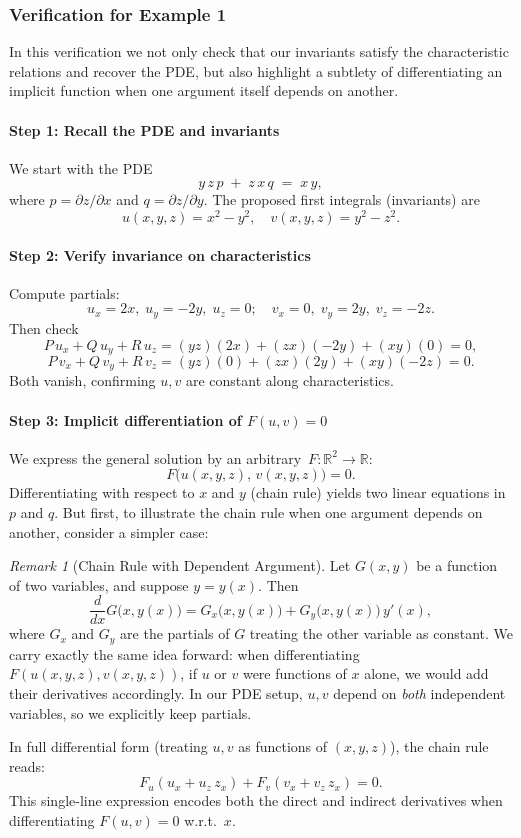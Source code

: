 \documentclass{article}
\theoremstyle{remark}
\newtheorem{remark}{Remark}[section]
\begin{document}
	\subsubsection{Verification for Example 1}
	In this verification we not only check that our invariants satisfy the characteristic relations and recover the PDE, but also highlight a subtlety of differentiating an implicit function when one argument itself depends on another.
	
	\paragraph{Step 1: Recall the PDE and invariants}
	We start with the PDE
	\[
	y\,z\,p \;+\; z\,x\,q \;=\; x\,y,
	\]
	where $p=\partial z/\partial x$ and $q=\partial z/\partial y$.  The proposed first integrals (invariants) are
	\[
	u(x,y,z)=x^2 - y^2,
	\quad
	v(x,y,z)=y^2 - z^2.
	\]
	
	\paragraph{Step 2: Verify invariance on characteristics}
	Compute partials:
	\[
	u_x=2x,\;u_y=-2y,\;u_z=0;
	\quad
	v_x=0,\;v_y=2y,\;v_z=-2z.
	\]
	Then check
	\[
	P\,u_x+Q\,u_y+R\,u_z=(yz)(2x)+(zx)(-2y)+(xy)(0)=0,
	\]
	\[
	P\,v_x+Q\,v_y+R\,v_z=(yz)(0)+(zx)(2y)+(xy)(-2z)=0.
	\]
	Both vanish, confirming $u,v$ are constant along characteristics.
	
	\paragraph{Step 3: Implicit differentiation of $F(u,v)=0$}
	We express the general solution by an arbitrary $\,F:\mathbb R^2\to\mathbb R$:
	\[
	F\bigl(u(x,y,z),\,v(x,y,z)\bigr)=0.
	\]
	Differentiating with respect to $x$ and $y$ (chain rule) yields two linear equations in $p$ and $q$.  But first, to illustrate the chain rule when one argument depends on another, consider a simpler case:
	
	\begin{remark}[Chain Rule with Dependent Argument]
		Let $G(x,y)$ be a function of two variables, and suppose $y=y(x)$.  Then
		\[
		\frac{d}{dx}G\bigl(x,y(x)\bigr)
		= G_x\bigl(x,y(x)\bigr)
		+ G_y\bigl(x,y(x)\bigr)\,y'(x),
		\]
		where $G_x$ and $G_y$ are the partials of $G$ treating the other variable as constant.  We carry exactly the same idea forward: when differentiating
		\(F(u(x,y,z),v(x,y,z))\), if $u$ or $v$ were functions of $x$ alone, we would add their derivatives accordingly.  In our PDE setup, $u,v$ depend on \emph{both} independent variables, so we explicitly keep partials.
	\end{remark}
	In full differential form (treating $u,v$ as functions of $(x,y,z)$), the chain rule reads:
	\[F_u(u_x + u_z\,z_x) + F_v(v_x + v_z\,z_x) = 0.\]
	This single-line expression encodes both the direct and indirect derivatives when differentiating $F(u,v)=0$ w.r.t.~$x$.    
	
\end{document}
